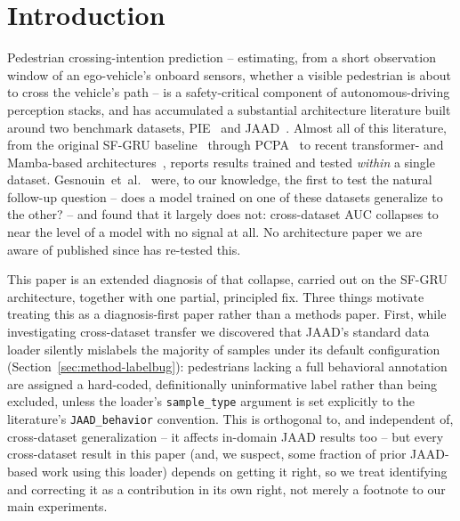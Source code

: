 
\section{Introduction}
\label{sec:intro}

Pedestrian crossing-intention prediction -- estimating, from a short
observation window of an ego-vehicle's onboard sensors, whether a
visible pedestrian is about to cross the vehicle's path -- is a
safety-critical component of autonomous-driving perception stacks, and
has accumulated a substantial architecture literature built around two
benchmark datasets, PIE~\cite{rasouli2019pie} and
JAAD~\cite{rasouli2017jaad}. Almost all of this literature, from the
original SF-GRU baseline~\cite{rasouli2020sfgru} through
PCPA~\cite{kotseruba2021pcpa} to recent transformer- and Mamba-based
architectures~\cite{adapt2026,trajfusionnet2026,efficientpie2025},
reports results trained and tested \emph{within} a single dataset.
Gesnouin~et~al.~\cite{gesnouin2022} were, to our knowledge, the first to
test the natural follow-up question -- does a model trained on one of
these datasets generalize to the other? -- and found that it largely
does not: cross-dataset AUC collapses to near the level of a model with
no signal at all. No architecture paper we are aware of published since
has re-tested this.

This paper is an extended diagnosis of that collapse, carried out on
the SF-GRU architecture, together with one partial, principled fix.
Three things motivate treating this as a diagnosis-first paper rather
than a methods paper. First, while investigating cross-dataset transfer
we discovered that JAAD's standard data loader silently mislabels the
majority of samples under its default configuration
(Section~\ref{sec:method-labelbug}): pedestrians lacking a full
behavioral annotation are assigned a hard-coded, definitionally
uninformative label rather than being excluded, unless the loader's
\texttt{sample\_type} argument is set explicitly to the literature's
\texttt{JAAD\_behavior} convention. This is orthogonal to, and
independent of, cross-dataset generalization -- it affects in-domain
JAAD results too -- but every cross-dataset result in this paper (and,
we suspect, some fraction of prior JAAD-based work using this loader)
depends on getting it right, so we treat identifying and correcting it
as a contribution in its own right, not merely a footnote to our main
experiments.


